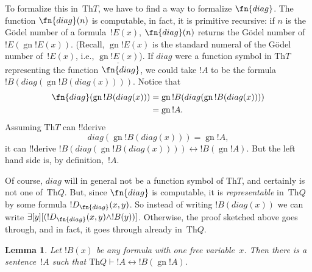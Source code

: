\documentclass[10pt,a4paper]{article}
\theoremstyle{plain}
\newtheorem{lem}[thm]{Lemma}
\theoremstyle{definition}
\theoremstyle{remark}
\newenvironment{explain}{}{}
\newcommand*{\ollabel}[1]{\label{#1}}
\providecommand{\lexists}{\mathord{\exists}}
\providecommand{\Proves}{\mathrel{\vdash}}
\providecommand{\Obj}{}
\providecommand{\Th}{\ensuremath{\mathrm{Th}}}
\providecommand{\num}[1]{\underline{#1}}
\providecommand{\Gn}{\operatorname{gn}}
\providecommand{\gn}{\operatorname{gn}}
\providecommand{\liff}{\mathbin{\leftrightarrow}}
\begin{document}
\begin{explain}
To formalize this in~$\Th{T}$, we have to find a way to formalize
$\fn{diag}$. The function $\fn{diag}(n)$ is computable, in fact, it is
primitive recursive: if $n$ is the G\"odel number of a
formula~$!E(x)$, $\fn{diag}(n)$ returns the G\"odel number
of~$!E(\gn{!E(x)})$. (Recall, $\gn{!E(x)}$ is the standard numeral of
the G\"odel number of~$!E(x)$, i.e., $\num{\Gn{!E(x)}}$). If
$\Obj{diag}$ were a function symbol in $\Th{T}$ representing the
function $\fn{diag}$, we could take $!A$ to be the formula
$!B(\Obj{diag}(\gn{!B(\Obj{diag}(x))}))$. Notice that
\begin{align*}
\fn{diag}(\Gn{!B(\Obj{diag}(x))}) & = 
\Gn{!B(\Obj{diag}(\gn{!B(\Obj{diag}(x))}))} \\
& = \Gn{!A}.
\end{align*}
Assuming $\Th{T}$ can !!{derive}
\[
\Obj{diag}(\gn{!B(\Obj{diag}(x))}) = \gn{!A},
\]
it can !!{derive} $!B(\Obj{diag}(\gn{!B(\Obj{diag}(x))}))
\liff !B(\gn{!A})$. But the left hand side is, by
definition,~$!A$.

Of course, $\Obj{diag}$ will in general not be a function symbol of
$\Th{T}$, and certainly is not one of~$\Th{Q}$. But, since $\fn{diag}$
is computable, it is \emph{representable} in~$\Th{Q}$ by some formula
$!D_{\fn{diag}}(x,y)$. So instead of writing $!B(\Obj{diag}(x))$ we
can write $\lexists[y][(!D_{\fn{diag}}(x,y) \land !B(y))]$. Otherwise,
the proof sketched above goes through, and in fact, it goes through
already in~$\Th{Q}$.
\end{explain}

\begin{lem}
\ollabel{lem:fixed-point} Let $!B(x)$ be any formula with one free
variable~$x$. Then there is a sentence~$!A$ such that $\Th{Q} \Proves
!A \liff !B(\gn{!A})$.
\end{lem}
\end{document}
